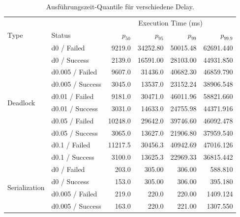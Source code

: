 \begin{table}[htbp]
	\centering
	\caption{Ausführungszeit-Quantile für verschiedene Delay.}
	\label{tab:d-quantiles}
	\scriptsize
	\setlength{\tabcolsep}{4pt}
	\begin{tabular}{llrrrr}
		\toprule
		& & \multicolumn{4}{c}{Execution Time (ms)} \\
		Type & Status & $p_{50}$ & $p_{95}$ & $p_{99}$ & $p_{99.9}$ \\
		\midrule

		\multirow{10}{*}{Deadlock}
		& d0 / Failed
		& 9219.0 & 34252.80 & 50015.48 & 62691.440 \\
		& d0 / Success
		& 2139.0 & 16591.00 & 28103.00 & 44931.850 \\

		& d0.005 / Failed
		& 9607.0 & 31436.0 & 40682.30 & 46859.790 \\
		& d0.005 / Success
		& 3045.0 & 13537.0 & 23152.24 & 38906.548 \\

		& d0.01 / Failed
		& 9181.0 & 30471.0 & 46011.96 & 58821.660 \\
		& d0.01 / Success
		& 3031.0 & 14633.0 & 24755.98 & 44371.916 \\

		& d0.05 / Failed
		& 10248.0 & 29642.0 & 39746.60 & 46092.478 \\
		& d0.05 / Success
		& 3065.0 & 13627.0 & 21906.80 & 37959.540 \\

		& d0.1 / Failed
		& 11217.5 & 30456.3 & 40942.69 & 47016.126 \\
		& d0.1 / Success
		& 3100.0 & 13625.3 & 22969.33 & 36815.442 \\

		\midrule

		\multirow{10}{*}{Serialization}
		& d0 / Failed
		& 203.0 & 305.00 & 306.00 & 588.810 \\
		& d0 / Success
		& 153.0 & 305.00 & 306.00 & 395.180 \\

		& d0.005 / Failed
		& 219.0 & 220.0 & 220.00 & 1409.124 \\
		& d0.005 / Success
		& 163.0 & 220.0 & 221.00 & 1307.550 \\


\end{tabular}
\end{table}
